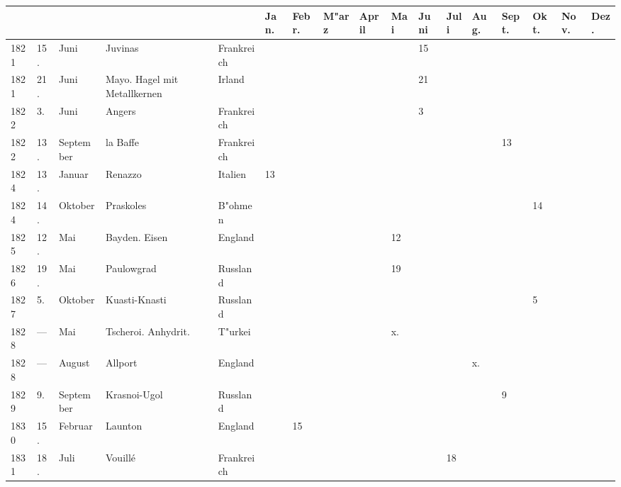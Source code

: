 \documentclass[a4paper, 8pt, oneside, polutonikogreek, german]{article}
\begin{document}
\begin{landscape}
\vspace*{\fill}
\begin{table}[H]
    \footnotesize
    \centering
    \begin{longtable}{|p{5mm}|p{4mm}|p{13mm}|p{23mm}|p{16mm}|p{4mm}|p{6mm}|p{6mm}|p{6mm}|p{4mm}|p{5mm}|p{4mm}|p{5mm}|p{6mm}|p{5mm}|p{5mm}|p{5mm}|}
    \hline
         &  &  &  &  & Jan. & Febr. & M"arz & April & Mai & Juni & Juli & Aug. & Sept. & Okt. & Nov. & Dez. \\ \hline
        1821 & 15. & Juni & Juvinas & Frankreich & ~ & ~ & ~ & ~ & ~ & 15 & ~ & ~ & ~ & ~ & ~ & ~ \\ \hline
        1821 & 21. & Juni & Mayo. Hagel mit Metallkernen & Irland & ~ & ~ & ~ & ~ & ~ & 21 & ~ & ~ & ~ & ~ & ~ & ~ \\ \hline
        1822 & 3. & Juni & Angers & Frankreich & ~ & ~ & ~ & ~ & ~ & 3 & ~ & ~ & ~ & ~ & ~ & ~ \\ \hline
        1822 & 13. & September & la Baffe & Frankreich & ~ & ~ & ~ & ~ & ~ & ~ & ~ & ~ & 13 & ~ & ~ & ~ \\ \hline
        1824 & 13. & Januar & Renazzo & Italien & 13 & ~ & ~ & ~ & ~ & ~ & ~ & ~ & ~ & ~ & ~ & ~ \\ \hline
        1824 & 14. & Oktober & Praskoles & B"ohmen & ~ & ~ & ~ & ~ & ~ & ~ & ~ & ~ & ~ & 14 & ~ & ~ \\ \hline
        1825 & 12. & Mai & Bayden. Eisen & England & ~ & ~ & ~ & ~ & 12 & ~ & ~ & ~ & ~ & ~ & ~ & ~ \\ \hline
        1826 & 19. & Mai & Paulowgrad & Russland & ~ & ~ & ~ & ~ & 19 & ~ & ~ & ~ & ~ & ~ & ~ & ~ \\ \hline
        1827 & 5. & Oktober & Kuasti-Knasti & Russland & ~ & ~ & ~ & ~ & ~ & ~ & ~ & ~ & ~ & 5 & ~ & ~ \\ \hline
        1828 & --- & Mai & Tscheroi. Anhydrit. & T"urkei & ~ & ~ & ~ & ~ & x. & ~ & ~ & ~ & ~ & ~ & ~ & ~ \\ \hline
        1828 & --- & August & Allport & England & ~ & ~ & ~ & ~ & ~ & ~ & ~ & x. & ~ & ~ & ~ & ~ \\ \hline
        1829 & 9. & September & Krasnoi-Ugol & Russland & ~ & ~ & ~ & ~ & ~ & ~ & ~ & ~ & 9 & ~ & ~ & ~ \\ \hline
        1830 & 15. & Februar & Launton & England & ~ & 15 & ~ & ~ & ~ & ~ & ~ & ~ & ~ & ~ & ~ & ~ \\ \hline
        1831 & 18. & Juli & Vouillé & Frankreich & ~ & ~ & ~ & ~ & ~ & ~ & 18 & ~ & ~ & ~ & ~ & ~ \\ \hline

\end{longtable}
\end{table}
\end{landscape}
\end{document}
